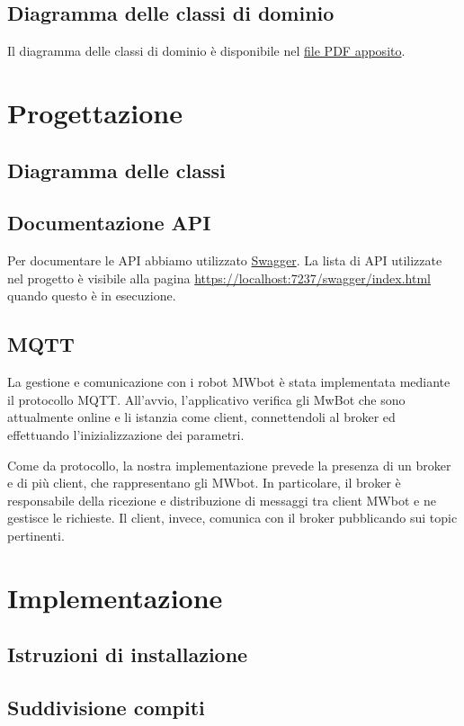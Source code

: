 \documentclass{article}
\begin{document}
\subsection{Diagramma delle classi di dominio}
Il diagramma delle classi di dominio è disponibile nel \href{run:./dominio.pdf}{file PDF apposito}.
\section{Progettazione}
\subsection{Diagramma delle classi}

\subsection{Documentazione API}
Per documentare le API abbiamo utilizzato \href{https://swagger.io}{Swagger}. La lista di API utilizzate nel progetto è visibile alla pagina \url{https://localhost:7237/swagger/index.html} quando questo è in esecuzione.
\subsection{MQTT}
La gestione e comunicazione con i robot MWbot è stata implementata mediante il protocollo MQTT. All'avvio, l'applicativo verifica gli MwBot che sono attualmente online e li istanzia come client, connettendoli al broker ed effettuando l'inizializzazione dei parametri.

Come da protocollo, la nostra implementazione prevede la presenza di un broker e di più client, che rappresentano gli MWbot. In particolare, il broker è responsabile della ricezione e distribuzione di messaggi tra client MWbot e ne gestisce le richieste. Il client, invece, comunica con il broker pubblicando sui topic pertinenti.


\section{Implementazione}
\subsection{Istruzioni di installazione}

\subsection{Suddivisione compiti}
\end{document}
